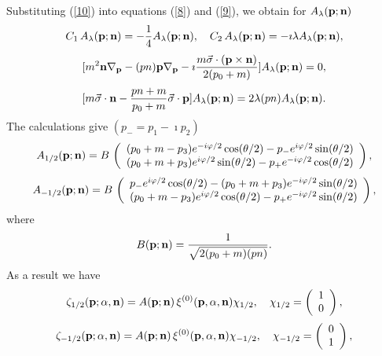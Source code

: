 \documentclass[a4paper,12pt]{article}
\begin{document}
Substituting (\ref{10}) into equations (\ref{8}) and (\ref{9}), we obtain  for $A_{\lambda}({\bf p};{\bf n})$  
\begin{equation}
\label{12}
C_1\,A_{\lambda}({\bf p};{\bf n})=-\frac{1}{4}A_{\lambda}({\bf p};{\bf n}),\quad{C_2}\,A_{\lambda}({\bf p};{\bf n})=-\imath{\lambda}A_{\lambda}({\bf p};{\bf n}),
\end{equation}
\begin{equation}
\label{13}
[m^{2}{\bf n}{\bf \nabla}_{\bf p}-(pn){\bf p}{\bf \nabla}_{\bf p}-\imath\frac{m{\vec \sigma}\cdot({{\bf p}\times{\bf n}})}{2(p_0+m)}]A_{\lambda}({\bf p};{\bf n})=0,
\end{equation}
\begin{equation}
\label{14}
[m{\vec \sigma}\cdot{\bf n}-\frac{pn+m}{p_0+m}{\vec \sigma}\cdot{\bf p}]A_{\lambda}({\bf p};{\bf n})=2\lambda(pn)A_{\lambda}({\bf p};{\bf n}).
\end{equation}
The calculations give $(p_{-}=p_{1}-\imath{p_{2}})$
\begin{equation}
\label{15}
A_{1/2}({\bf p};{\bf n})=B\,\left( \begin{array}{ccc}(p_0+m-p_3)e^{-i\varphi/2}\cos({\theta}/2)-p_{-}e^{i\varphi/2}\sin({\theta}/2) \\(p_0+m+p_3)e^{i\varphi/2}\sin({\theta}/2)-p_{+}e^{-i\varphi/2}\cos({\theta}/2)\end{array}\right),
\end{equation}
\begin{equation}
\label{16}
A_{-1/2}({\bf p};{\bf n})=B\,\left( \begin{array}{ccc}p_{-}e^{i\varphi/2}\cos({\theta}/2)-(p_0+m+p_3)e^{-i\varphi/2}\sin({\theta}/2) \\(p_0+m-p_3)e^{i\varphi/2}\cos({\theta}/2)-p_{+}e^{-i\varphi/2}\sin({\theta}/2)\end{array}\right),
\end{equation}
where 
\begin{equation}
\label{17}
B({\bf p};{\bf n})=\frac{1}{\sqrt{2(p_0+m)(pn)}}.
\end{equation}
As a result we have  
\begin{equation}
\label{18}
\zeta_{1/2}({\bf p};\alpha,{\bf n})={A}({\bf p};{\bf n})\,\xi^{(0)}({\bf p},\alpha,{\bf n}){\chi}_{1/2},{\quad}\chi_{1/2}=\left( \begin{array}{ccc}1\\0\end{array}\right),
\end{equation}
\begin{equation} 
\label{19}
\zeta_{-1/2}({\bf p};\alpha,{\bf n})={A}({\bf p};{\bf n})\,\xi^{(0)}({\bf p},\alpha,{\bf n}){\chi}_{-1/2},\quad\chi_{-1/2}=\left( \begin{array}{ccc}0\\1\end{array}\right),
\end{equation}
\end{document}
